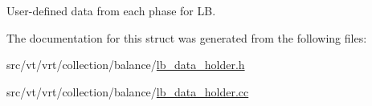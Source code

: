 User-\/defined data from each phase for LB. 



The documentation for this struct was generated from the following files\+:\begin{DoxyCompactItemize}
\item 
src/vt/vrt/collection/balance/\hyperlink{lb__data__holder_8h}{lb\+\_\+data\+\_\+holder.\+h}\item 
src/vt/vrt/collection/balance/\hyperlink{lb__data__holder_8cc}{lb\+\_\+data\+\_\+holder.\+cc}\end{DoxyCompactItemize}
